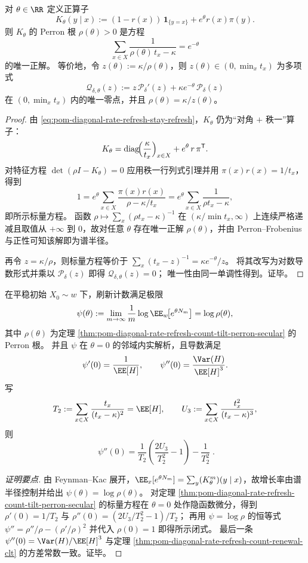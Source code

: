 \begin{theorem}\label{thm:pom-diagonal-rate-refresh-count-tilt-perron-secular}
对 \(\theta\in\RR\) 定义正算子
\[
K_\theta(y\mid x):=(1-r(x))\,\mathbf 1_{\{y=x\}}+e^{\theta}r(x)\pi(y).
\]
则 \(K_\theta\) 的 Perron 根 \(\rho(\theta)>0\) 是方程
\[
\boxed{\;
\sum_{x\in X}\frac{1}{\rho(\theta)\,t_x-\kappa}=e^{-\theta}\;}
\]
的唯一正解。
等价地，令 \(z(\theta):=\kappa/\rho(\theta)\)，则 \(z(\theta)\in(0,\min_x t_x)\) 为多项式
\[
\mathcal Q_{\delta,\theta}(z):=z\,\mathcal P_\delta'(z)+\kappa e^{-\theta}\,\mathcal P_\delta(z)
\]
在 \((0,\min_x t_x)\) 内的唯一零点，并且 \(\rho(\theta)=\kappa/z(\theta)\)。
\end{theorem}
\begin{proof}
由 \eqref{eq:pom-diagonal-rate-refresh-stay-refresh}，\(K_\theta\) 仍为“对角 \(+\) 秩一”算子：
\[
K_\theta=\mathrm{diag}\!\Bigl(\frac{\kappa}{t_x}\Bigr)_{x\in X}+e^{\theta}\,r\,\pi^{\mathsf T}.
\]
对特征方程 \(\det(\rho I-K_\theta)=0\) 应用秩一行列式引理并用 \(\pi(x)r(x)=1/t_x\)，得到
\[
1=e^{\theta}\sum_{x\in X}\frac{\pi(x)r(x)}{\rho-\kappa/t_x}
=e^{\theta}\sum_{x\in X}\frac{1}{\rho t_x-\kappa},
\]
即所示标量方程。
函数 \(\rho\mapsto \sum_x(\rho t_x-\kappa)^{-1}\) 在 \((\kappa/\min t_x,\infty)\) 上连续严格递减且取值从 \(+\infty\) 到 \(0\)，故对任意 \(\theta\) 存在唯一正解 \(\rho(\theta)\)，并由 Perron--Frobenius 与正性可知该解即为谱半径。
\par
再令 \(z=\kappa/\rho\)，则标量方程等价于
\(
\sum_x (t_x-z)^{-1}=\kappa e^{-\theta}/z
\)。
将其改写为对数导数形式并乘以 \(\mathcal P_\delta(z)\) 即得 \(\mathcal Q_{\delta,\theta}(z)=0\)；
唯一性由同一单调性得到。证毕。
\end{proof}

\begin{corollary}\label{cor:pom-diagonal-rate-refresh-count-scgf-derivatives}
在平稳初始 \(X_0\sim w\) 下，刷新计数满足极限
\[
\psi(\theta):=\lim_{m\to\infty}\frac{1}{m}\log \EE_w\!\bigl[e^{\theta N_m}\bigr]=\log\rho(\theta),
\]
其中 \(\rho(\theta)\) 为定理 \ref{thm:pom-diagonal-rate-refresh-count-tilt-perron-secular} 的 Perron 根。
并且 \(\psi\) 在 \(\theta=0\) 的邻域内实解析，且导数满足
\[
\psi'(0)=\frac{1}{\EE[H]},
\qquad
\psi''(0)=\frac{\Var(H)}{\EE[H]^3}.
\]
写
\[
T_2:=\sum_{x\in X}\frac{t_x}{(t_x-\kappa)^2}=\EE[H],
\qquad
U_3:=\sum_{x\in X}\frac{t_x^{2}}{(t_x-\kappa)^3},
\]
则
\[
\boxed{\;
\psi''(0)=\frac{1}{T_2}\left(\frac{2U_3}{T_2^2}-1\right)-\frac{1}{T_2^2}\; } .
\]
\end{corollary}
\begin{proof}[证明要点]
由 Feynman--Kac 展开，\(\EE_x[e^{\theta N_m}]=\sum_y (K_\theta^m)(y\mid x)\)，故增长率由谱半径控制并给出 \(\psi(\theta)=\log\rho(\theta)\)。
对定理 \ref{thm:pom-diagonal-rate-refresh-count-tilt-perron-secular} 的标量方程在 \(\theta=0\) 处作隐函数微分，得到
\(
\rho'(0)=1/T_2
\)
与
\(
\rho''(0)=(2U_3/T_2^2-1)/T_2
\)；
再用 \(\psi=\log\rho\) 的恒等式 \(\psi''=\rho''/\rho-(\rho'/\rho)^2\) 并代入 \(\rho(0)=1\) 即得所示闭式。
最后一条 \(\psi''(0)=\Var(H)/\EE[H]^3\) 与定理 \ref{thm:pom-diagonal-rate-refresh-count-renewal-clt} 的方差常数一致。证毕。
\end{proof}

